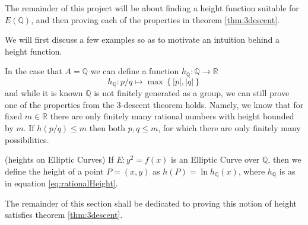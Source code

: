 The remainder of this project will be about finding a height function
suitable for $E(\mathbb{Q})$, and then proving each of the properties
in theorem \ref{thm:3descent}.

We will first discuss a few examples so as to motivate an intuition behind
a height function.
\begin{example}
  In the case that $A = \mathbb{Q}$ we can define a function
  $h_{\mathbb{Q}}: \mathbb{Q} \to \mathbb{R}$
  \begin{equation} \label{eq:rationalHeight}
    h_{\mathbb{Q}}: p/q \mapsto \max \left\{ |p|, |q| \right\}
  \end{equation}
  and while it is known $\mathbb{Q}$ is not finitely generated
  as a group, we can still prove one of the properties from the
  3-descent theorem holds.
  Namely, we know that for fixed $m \in \mathbb{R}$ there
  are only finitely many rational numbers with height bounded
  by $m$. If $h(p/q) \leq m$ then both $p, q \leq m$,
  for which there are only finitely many possibilities.
\end{example}
\begin{definition} \label{def:ellipticHeight}
  (heights on Elliptic Curves)
  If $E: y^2 = f(x)$ is an Elliptic Curve over $\mathbb{Q}$, then
  we define the height of a point $P = (x,y)$ as
  $h(P) = \ln h_{\mathbb{Q}}(x)$, where $h_{\mathbb{Q}}$ is
  as in equation \ref{eq:rationalHeight}.
\end{definition}
The remainder of this section shall be dedicated to proving
this notion of height satisfies theorem \ref{thm:3descent}.


